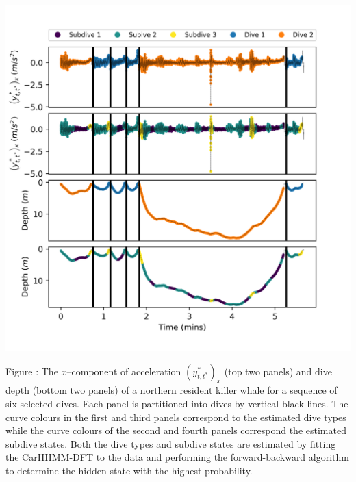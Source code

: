 \documentclass{article}
\begin{document}
        \begin{center}
        \includegraphics[width=6in]{../Plots/CarHHMM2_decoded_dives.png}
        \end{center}
        
        \noindent Figure : The $x$--component of acceleration $\left(y^*_{t,t^*}\right)_x$ (top two panels) and dive depth (bottom two panels) of a northern resident killer whale for a sequence of six selected dives. Each panel is partitioned into dives by vertical black lines. The curve colours in the first and third panels correspond to the estimated dive types while the curve colours of the second and fourth panels correspond the estimated subdive states. Both the dive types and subdive states are estimated by fitting the CarHHMM-DFT to the data and performing the forward-backward algorithm to determine the hidden state with the highest probability.
        \addtocounter{fignum}{1}
        
\end{document}
